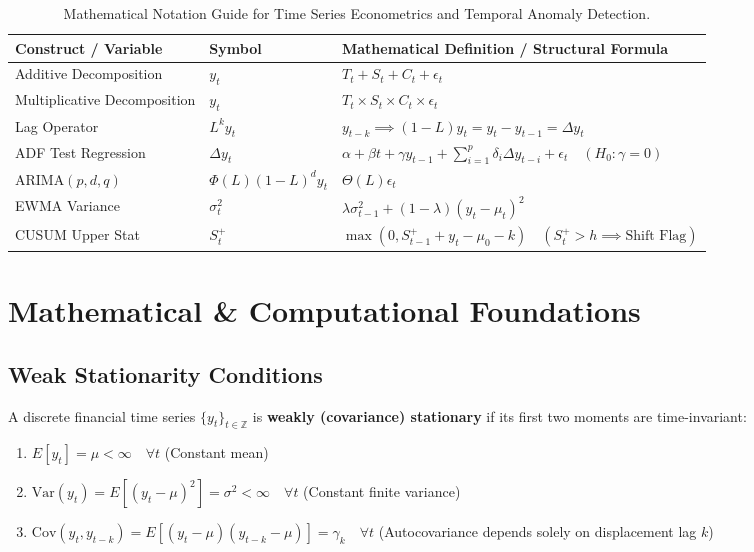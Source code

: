 \begin{table}[htbp]
\centering
\small
\begin{tabularx}{\textwidth}{llX}
\toprule
\textbf{Construct / Variable} & \textbf{Symbol} & \textbf{Mathematical Definition / Structural Formula} \\
\midrule
Additive Decomposition & $y_t$ & $T_t + S_t + C_t + \epsilon_t$ \\
Multiplicative Decomposition & $y_t$ & $T_t \times S_t \times C_t \times \epsilon_t$ \\
Lag Operator & $L^k y_t$ & $y_{t-k} \implies (1 - L) y_t = y_t - y_{t-1} = \Delta y_t$ \\
ADF Test Regression & $\Delta y_t$ & $\alpha + \beta t + \gamma y_{t-1} + \sum_{i=1}^p \delta_i \Delta y_{t-i} + \epsilon_t \quad (H_0: \gamma = 0)$ \\
$\text{ARIMA}(p, d, q)$ & $\Phi(L)(1-L)^d y_t$ & $\Theta(L) \epsilon_t$ \\
EWMA Variance & $\sigma_t^2$ & $\lambda \sigma_{t-1}^2 + (1 - \lambda)(y_t - \mu_t)^2$ \\
CUSUM Upper Stat & $S_t^+$ & $\max(0, S_{t-1}^+ + y_t - \mu_0 - k) \quad (S_t^+ > h \implies \text{Shift Flag})$ \\
\bottomrule
\end{tabularx}
\caption{Mathematical Notation Guide for Time Series Econometrics and Temporal Anomaly Detection.}
\label{tab:w10_notation}
\end{table}

\section{Mathematical \& Computational Foundations}

\subsection{Weak Stationarity Conditions}
A discrete financial time series $\{y_t\}_{t \in \mathbb{Z}}$ is \textbf{weakly (covariance) stationary} if its first two moments are time-invariant:
\begin{enumerate}
    \item $E[y_t] = \mu < \infty \quad \forall t$ (Constant mean)
    \item $\text{Var}(y_t) = E[(y_t - \mu)^2] = \sigma^2 < \infty \quad \forall t$ (Constant finite variance)
    \item $\text{Cov}(y_t, y_{t-k}) = E[(y_t - \mu)(y_{t-k} - \mu)] = \gamma_k \quad \forall t$ (Autocovariance depends solely on displacement lag $k$)
\end{enumerate}

